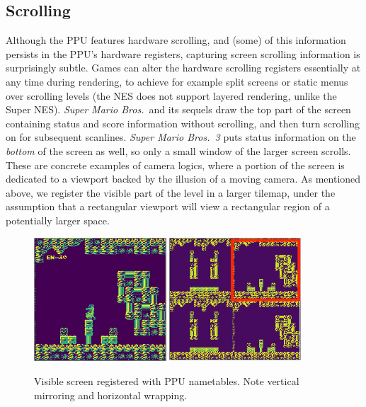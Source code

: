 \documentclass[a4paper]{article}
\begin{document}
\subsection{Scrolling}

Although the PPU features hardware scrolling, and (some) of this information persists in the PPU's hardware registers, capturing screen scrolling information is surprisingly subtle.
Games can alter the hardware scrolling registers essentially at any time during rendering, to achieve for example split screens or static menus over scrolling levels (the NES does not support layered rendering, unlike the Super NES).
\emph{Super Mario Bros.}\ and its sequels draw the top part of the screen containing status and score information without scrolling, and then turn scrolling on for subsequent scanlines.
\emph{Super Mario Bros.\ 3} puts status information on the \emph{bottom} of the screen as well, so only a small window of the larger screen scrolls.
These are concrete examples of camera logics, where a portion of the screen is dedicated to a viewport backed by the illusion of a moving camera.
As mentioned above, we register the visible part of the level in a larger tilemap, under the assumption that a rectangular viewport will view a rectangular region of a potentially larger space.

\begin{figure}
  \includegraphics[width=0.44\textwidth]{figures/screen.png}
  \includegraphics[width=0.44\textwidth]{figures/ntram.png}
  \caption{Visible screen registered with PPU nametables.  Note vertical mirroring and horizontal wrapping.} \label{fig:ntas}
\end{figure}
\end{document}
